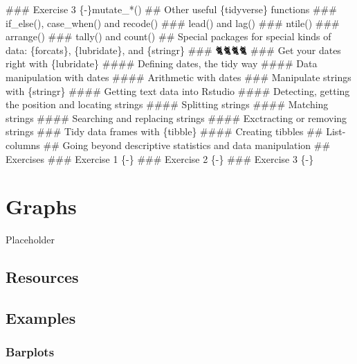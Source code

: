 \documentclass[]{gitbook}
\begin{document}
{{{\#\#\# Exercise 3 \{-\}}{mutate\_*() \#\# Other useful \{tidyverse\} functions \#\#\# if\_else(), case\_when() and recode() \#\#\# lead() and lag() \#\#\# ntile() \#\#\# arrange() \#\#\# tally() and count() \#\# Special packages for special kinds of data: \{forcats\}, \{lubridate\}, and \{stringr\} \#\#\# 🐈🐈🐈🐈 \#\#\# Get your dates right with \{lubridate\} \#\#\#\# Defining dates, the tidy way \#\#\#\# Data manipulation with dates \#\#\#\# Arithmetic with dates \#\#\# Manipulate strings with \{stringr\} \#\#\#\# Getting text data into Rstudio \#\#\#\# Detecting, getting the position and locating strings \#\#\#\# Splitting strings \#\#\#\# Matching strings \#\#\#\# Searching and replacing strings \#\#\#\# Exctracting or removing strings \#\#\# Tidy data frames with \{tibble\} \#\#\#\# Creating tibbles \#\# List-columns \#\# Going beyond descriptive statistics and data manipulation \#\# Exercises \#\#\# Exercise 1 \{-\} \#\#\# Exercise 2 \{-\} \#\#\# Exercise 3 \{-\}}}\label{mutate_-other-useful-tidyverse-functions-if_else-case_when-and-recode-lead-and-lag-ntile-arrange-tally-and-count-special-packages-for-special-kinds-of-data-forcats-lubridate-and-stringr-get-your-dates-right-with-lubridate-defining-dates-the-tidy-way-data-manipulation-with-dates-arithmetic-with-dates-manipulate-strings-with-stringr-getting-text-data-into-rstudio-detecting-getting-the-position-and-locating-strings-splitting-strings-matching-strings-searching-and-replacing-strings-exctracting-or-removing-strings-tidy-data-frames-with-tibble-creating-tibbles-list-columns-going-beyond-descriptive-statistics-and-data-manipulation-exercises-exercise-1---exercise-2---exercise-3--}}

\hypertarget{graphs}{%
\section{Graphs}\label{graphs}}

Placeholder

\hypertarget{resources}{%
\subsection{Resources}\label{resources}}

\hypertarget{examples}{%
\subsection{Examples}\label{examples}}

\hypertarget{barplots}{%
\subsubsection{Barplots}\label{barplots}}
\end{document}
